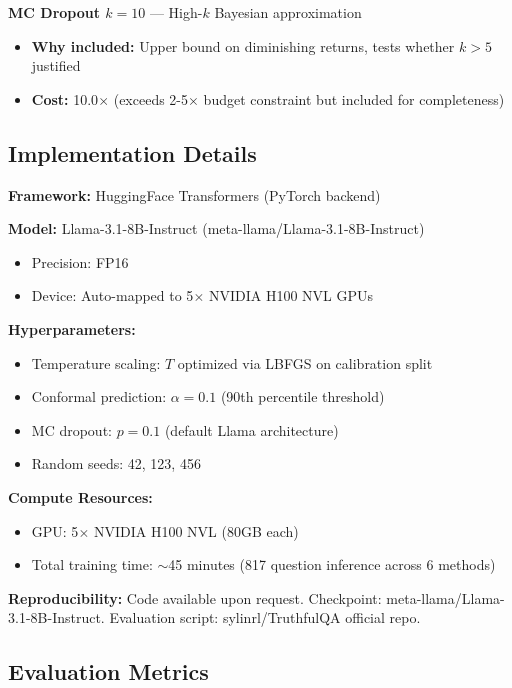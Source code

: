 \textbf{MC Dropout $k=10$} --- High-$k$ Bayesian approximation
\begin{itemize}
    \item \textbf{Why included:} Upper bound on diminishing returns, tests whether $k>5$ justified
    \item \textbf{Cost:} 10.0$\times$ (exceeds 2-5$\times$ budget constraint but included for completeness)
\end{itemize}

\subsection{Implementation Details}

\textbf{Framework:} HuggingFace Transformers (PyTorch backend)

\textbf{Model:} Llama-3.1-8B-Instruct (meta-llama/Llama-3.1-8B-Instruct)
\begin{itemize}
    \item Precision: FP16
    \item Device: Auto-mapped to 5$\times$ NVIDIA H100 NVL GPUs
\end{itemize}

\textbf{Hyperparameters:}
\begin{itemize}
    \item Temperature scaling: $T$ optimized via LBFGS on calibration split
    \item Conformal prediction: $\alpha = 0.1$ (90th percentile threshold)
    \item MC dropout: $p = 0.1$ (default Llama architecture)
    \item Random seeds: 42, 123, 456
\end{itemize}

\textbf{Compute Resources:}
\begin{itemize}
    \item GPU: 5$\times$ NVIDIA H100 NVL (80GB each)
    \item Total training time: $\sim$45 minutes (817 question inference across 6 methods)
\end{itemize}

\textbf{Reproducibility:} Code available upon request. Checkpoint: meta-llama/Llama-3.1-8B-Instruct. Evaluation script: sylinrl/TruthfulQA official repo.

\subsection{Evaluation Metrics}

